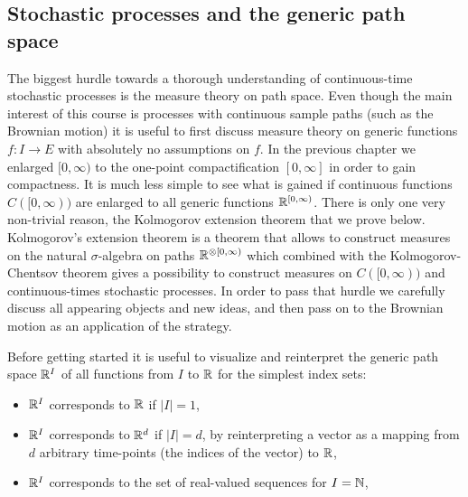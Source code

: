 \subsection{Stochastic processes and the generic path space}
The biggest hurdle towards a thorough understanding of continuous-time stochastic processes is the measure theory on path space. Even though the main interest of this course is processes with continuous sample paths (such as the Brownian motion) it is useful to first discuss measure theory on generic functions $f:I\to E$ with absolutely no assumptions on $f$. In the previous chapter we enlarged $[0,\infty)$ to the one-point compactification $[0,\infty]$ in order to gain compactness. It is much less simple to see what is gained if continuous functions $C([0,\infty))$ are enlarged to all generic functions $\mathbb{R}^{[0,\infty)}$. There is only one very non-trivial reason, the Kolmogorov extension theorem that we prove below. Kolmogorov's extension theorem is a theorem that allows to construct measures on the natural $\sigma$-algebra on paths $\mathbb{R}^{\otimes [0,\infty)}$ which combined with the Kolmogorov-Chentsov theorem gives a possibility to construct measures on $C([0,\infty))$ and continuous-times stochastic processes. In order to pass that hurdle we carefully discuss all appearing objects and new ideas, and then pass on to the Brownian motion as an application of the strategy. \smallskip




Before getting started it is useful to visualize and reinterpret the generic path space $\mathbb{R}^I$ of all functions from $I$ to $\mathbb{R}$ for the simplest index sets:
\begin{itemize}
	\item $\mathbb{R}^I$ corresponds to $\mathbb{R}$ if $|I|=1$,
	\item $\mathbb{R}^I$ corresponds to $\mathbb{R}^d$ if $|I|=d$, by reinterpreting a vector as a mapping from $d$ arbitrary time-points (the indices of the vector) to $\mathbb{R}$,
	\item $\mathbb{R}^I$ corresponds to the set of real-valued sequences for $I=\mathbb{N}$,
\end{itemize}

